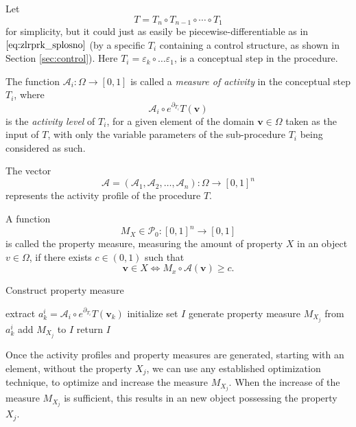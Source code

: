 \documentclass[smallcondensed]{svjour3}
\newcommand{\vv}{\mathbf{v}}
\newcommand{\dP}{\mathcal{P}}
\newcommand{\D}{\partial}
\begin{document}
   Let 
   $$T=T_n\circ T_{n-1}\circ\cdots\circ T_1$$
   for simplicity, but it could just as easily be piecewise-differentiable as in $\eqref{eq:zlrprk_splosno}$ (by a specific $T_i$ containing a control structure, as shown in Section \ref{sec:control}). Here $T_i=\varepsilon_k\circ\ldots \varepsilon_1$, is a conceptual step in the procedure.
  
   
   \begin{definition}
   The function $\mathcal{A}_i:\Omega\to[0,1]$ is called a \emph{measure of activity} in the conceptual step $T_i$, where 
   $$\mathcal{A}_i\circ e^{\D_{T_i}}T(\vv)$$ 
   is the \emph{activity level} of $T_i$, for a given element of the domain $\vv\in \Omega$ taken as the input of $T$, with only the variable parameters of the sub-procedure $T_i$ being considered as such.
   
   The vector $$\mathcal{A}=(\mathcal{A}_1,\mathcal{A}_2,\dots,\mathcal{A}_n):\Omega\to[0,1]^n$$ represents the activity profile of the procedure $T$. 
   \end{definition}
   
   
   \begin{definition}
    A function 
    $$M_X\in\dP_0:[0,1]^n\to[0,1]$$  
    is called the property measure, measuring the amount of property $X$ in an object $v\in\Omega$, if there exists  $c\in(0,1)$ such that 
    $$\vv\in X\iff M_x\circ\mathcal{A}(\vv)\ge c.$$
    \end{definition}
   \vspace{-1cm}
   \begin{algorithm}[H]

     
   \caption{Construct property measure}
   \label{alg:propertyMeasure}
   \begin{algorithmic}[1]
   \For{each $\vv_k\in \Omega$}
   \State extract $a^i_k=\mathcal{A}_i\circ e^{\D_{T_i}}T(\vv_k)$
	\EndFor
	\EndFor
	\State initialize set $I$
   \State generate property measure $M_{X_j}$ from $a^i_k$
   \State add $M_{X_j}$ to $I$
   \EndFor
   \State return $I$
   \EndProcedure
   \end{algorithmic}
   \end{algorithm}
   
   Once the activity profiles and property measures are generated, starting with an element, without the property $X_j$, we can use any established optimization technique, to optimize and increase the measure $M_{X_j}$. When the increase of the measure $M_{X_j}$ is sufficient, this results in an new object possessing the property $X_j$.
   
\end{document}
